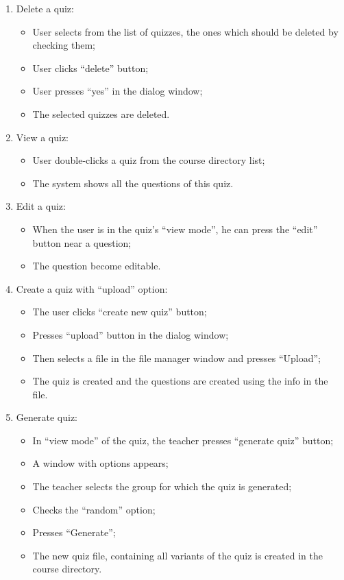 \begin{enumerate}
  \item Delete a quiz:
  \begin{itemize}
    \item User selects from the list of quizzes, the ones which should be deleted by checking them;
    \item User clicks “delete” button;
    \item User presses “yes” in the dialog window;
    \item The selected quizzes are deleted.
  \end{itemize}    

  \item View a quiz:
  \begin{itemize}
    \item User double-clicks a quiz from the course directory list;
    \item The system shows all the questions of this quiz.
  \end{itemize}    

  \item Edit a quiz:
  \begin{itemize}
    \item When the user is in the quiz’s “view mode”, he can press the “edit” button near a question;
    \item The question become editable.
  \end{itemize}    

  \item Create a quiz with “upload” option:
  \begin{itemize}
    \item The user clicks “create new quiz” button;
    \item Presses “upload” button in the dialog window;
    \item Then selects a file in the file manager window and presses “Upload”;
    \item The quiz is created and the questions are created using the info in the file.
  \end{itemize}

  \item Generate quiz:
  \begin{itemize}
    \item In “view mode” of the quiz, the teacher presses “generate quiz” button;
    \item A window with options appears;
    \item The teacher selects the group for which the quiz is generated;
    \item Checks the “random” option;
    \item Presses “Generate”;
    \item The new quiz file, containing all variants of the quiz is created in the course directory.
  \end{itemize}


\end{enumerate}
